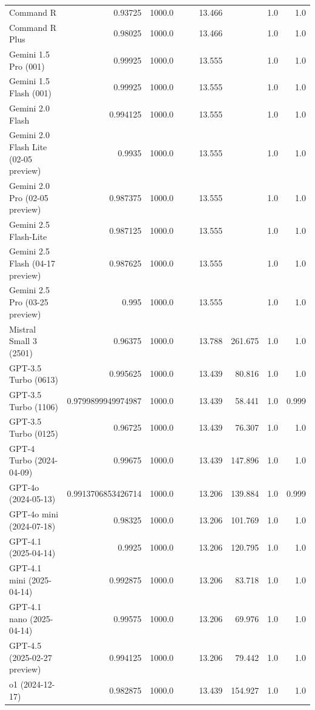 \begin{table}[htp]
{\begin{tabular}{lrrrrrrrr}
Command R & 0.93725 & 1000.0 &  &  & 13.466 &  & 1.0 & 1.0 \\
Command R Plus & 0.98025 & 1000.0 &  &  & 13.466 &  & 1.0 & 1.0 \\
Gemini 1.5 Pro (001) & 0.99925 & 1000.0 &  &  & 13.555 &  & 1.0 & 1.0 \\
Gemini 1.5 Flash (001) & 0.99925 & 1000.0 &  &  & 13.555 &  & 1.0 & 1.0 \\
Gemini 2.0 Flash & 0.994125 & 1000.0 &  &  & 13.555 &  & 1.0 & 1.0 \\
Gemini 2.0 Flash Lite (02-05 preview) & 0.9935 & 1000.0 &  &  & 13.555 &  & 1.0 & 1.0 \\
Gemini 2.0 Pro (02-05 preview) & 0.987375 & 1000.0 &  &  & 13.555 &  & 1.0 & 1.0 \\
Gemini 2.5 Flash-Lite & 0.987125 & 1000.0 &  &  & 13.555 &  & 1.0 & 1.0 \\
Gemini 2.5 Flash (04-17 preview) & 0.987625 & 1000.0 &  &  & 13.555 &  & 1.0 & 1.0 \\
Gemini 2.5 Pro (03-25 preview) & 0.995 & 1000.0 &  &  & 13.555 &  & 1.0 & 1.0 \\
Mistral Small 3 (2501) & 0.96375 & 1000.0 &  &  & 13.788 & 261.675 & 1.0 & 1.0 \\
GPT-3.5 Turbo (0613) & 0.995625 & 1000.0 &  &  & 13.439 & 80.816 & 1.0 & 1.0 \\
GPT-3.5 Turbo (1106) & 0.9799899949974987 & 1000.0 &  &  & 13.439 & 58.441 & 1.0 & 0.999 \\
GPT-3.5 Turbo (0125) & 0.96725 & 1000.0 &  &  & 13.439 & 76.307 & 1.0 & 1.0 \\
GPT-4 Turbo (2024-04-09) & 0.99675 & 1000.0 &  &  & 13.439 & 147.896 & 1.0 & 1.0 \\
GPT-4o (2024-05-13) & 0.9913706853426714 & 1000.0 &  &  & 13.206 & 139.884 & 1.0 & 0.999 \\
GPT-4o mini (2024-07-18) & 0.98325 & 1000.0 &  &  & 13.206 & 101.769 & 1.0 & 1.0 \\
GPT-4.1 (2025-04-14) & 0.9925 & 1000.0 &  &  & 13.206 & 120.795 & 1.0 & 1.0 \\
GPT-4.1 mini (2025-04-14) & 0.992875 & 1000.0 &  &  & 13.206 & 83.718 & 1.0 & 1.0 \\
GPT-4.1 nano (2025-04-14) & 0.99575 & 1000.0 &  &  & 13.206 & 69.976 & 1.0 & 1.0 \\
GPT-4.5 (2025-02-27 preview) & 0.994125 & 1000.0 &  &  & 13.206 & 79.442 & 1.0 & 1.0 \\
o1 (2024-12-17) & 0.982875 & 1000.0 &  &  & 13.439 & 154.927 & 1.0 & 1.0 \\

\end{tabular}}
\end{table}
